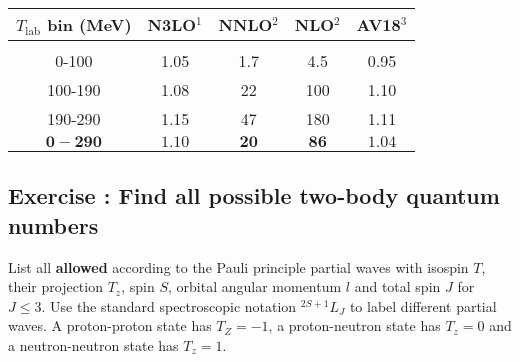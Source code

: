 \documentclass[graybox,sectrefs,envcountresetchap,open=right]{svmonodo}
\newenvironment{doconceexercise}{}{}
\newcounter{doconceexercisecounter}
\begin{document}
{  %

\vspace{4mm}

\begin{tabular}{ccccc}
\hline
\multicolumn{1}{c}{ $T_{\mathrm{lab}}$ bin (MeV) } & \multicolumn{1}{c}{ N3LO$^1$ } & \multicolumn{1}{c}{ NNLO$^2$ } & \multicolumn{1}{c}{ NLO$^2$ } & \multicolumn{1}{c}{ AV18$^3$ } \\
\hline
                             &                 &               &               &                 \\
0-100                        & 1.05            & 1.7           & 4.5           & 0.95            \\
100-190                      & 1.08            & 22            & 100           & 1.10            \\
190-290                      & 1.15            & 47            & 180           & 1.11            \\
$\mathbf{0-290}$             & $\mathbf{1.10}$ & $\mathbf{20}$ & $\mathbf{86}$ & $\mathbf{1.04}$ \\
\hline
\end{tabular}

\vspace{4mm}

}


\clearpage %

\begin{doconceexercise}

\subsection*{Exercise \thedoconceexercisecounter: Find all possible two-body quantum numbers}


List all \textbf{allowed} according to the Pauli principle partial waves with isospin $T$, their 
projection $T_z$, spin $S$, orbital angular momentum $l$ and total spin $J$ for $J\le 3$.
Use the standard spectroscopic notation $^{2S+1}L_J$ to label different partial waves. A proton-proton state
has $T_Z=-1$, a proton-neutron state has $T_z=0$ and a neutron-neutron state has $T_z=1$.

\end{doconceexercise}
\end{document}

